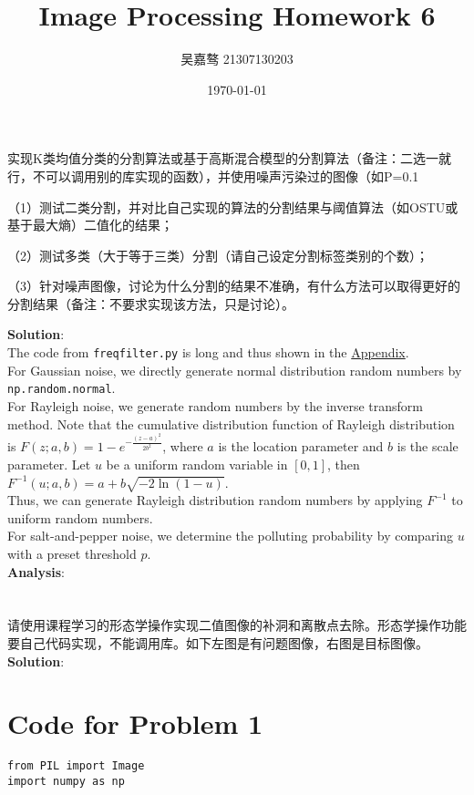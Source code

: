 \documentclass[UTF8]{ctexart}
\title{\textbf{Image Processing Homework 6}}
\author{吴嘉骜 21307130203}
\date{\today}
\begin{document}
\maketitle

\noindent
\section{}
\setlength{\parindent}{0pt}
实现K类均值分类的分割算法或基于高斯混合模型的分割算法（备注：二选一就行，不可以调用别的库实现的函数），并使用噪声污染过的图像（如P=0.1%

（1）测试二类分割，并对比自己实现的算法的分割结果与阈值算法（如OSTU或基于最大熵）二值化的结果；

（2）测试多类（大于等于三类）分割（请自己设定分割标签类别的个数）；

（3）针对噪声图像，讨论为什么分割的结果不准确，有什么方法可以取得更好的分割结果（备注：不要求实现该方法，只是讨论）。


\textbf{Solution}:\\
The code from \texttt{freqfilter.py} is long and thus shown in the \hyperlink{code1}{Appendix}.\\


For Gaussian noise, we directly generate normal distribution random numbers by \texttt{np.random.normal}.\\
For Rayleigh noise, we generate random numbers by the inverse transform method. Note that the cumulative distribution function of Rayleigh distribution is
$F(z;a,b)=1-e^{-\frac{(z-a)^2}{2b^2}}$, where $a$ is the location parameter and $b$ is the scale parameter. Let $u$ be a uniform random variable in $[0,1]$, then $F^{-1}(u;a,b)=a+b\sqrt{-2\ln(1-u)}$.\\
Thus, we can generate Rayleigh distribution random numbers by applying $F^{-1}$ to uniform random numbers.\\
For salt-and-pepper noise, we determine the polluting probability by comparing $u$ with a preset threshold $p$.\\

\textbf{Analysis}:\\


\section{}
请使用课程学习的形态学操作实现二值图像的补洞和离散点去除。形态学操作功能要自己代码实现，不能调用库。如下左图是有问题图像，右图是目标图像。
\textbf{Solution}:\\


\newpage
\appendix
\hypertarget{code1}{\section{Code for Problem 1}}
\begin{lstlisting}
from PIL import Image
import numpy as np
\end{lstlisting}
\end{document}

